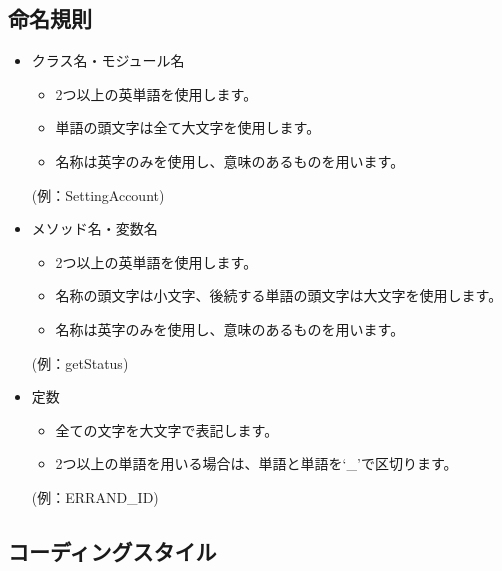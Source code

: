 \documentclass[a4j]{jarticle}
\begin{document}
\subsection{命名規則}
\begin{itemize}
  \item クラス名・モジュール名
  \begin{itemize}
    \item 2つ以上の英単語を使用します。
    \item 単語の頭文字は全て大文字を使用します。
    \item 名称は英字のみを使用し、意味のあるものを用います。
  \end{itemize}
  (例：SettingAccount)

  \item メソッド名・変数名
  \begin{itemize}
    \item 2つ以上の英単語を使用します。
    \item 名称の頭文字は小文字、後続する単語の頭文字は大文字を使用します。
    \item 名称は英字のみを使用し、意味のあるものを用います。
  \end{itemize}
  (例：getStatus)

  \item 定数
  \begin{itemize}
    \item 全ての文字を大文字で表記します。
    \item 2つ以上の単語を用いる場合は、単語と単語を‘\_’で区切ります。
  \end{itemize}
  (例：ERRAND\_ID)
\end{itemize}

\subsection{コーディングスタイル}
\end{document}
